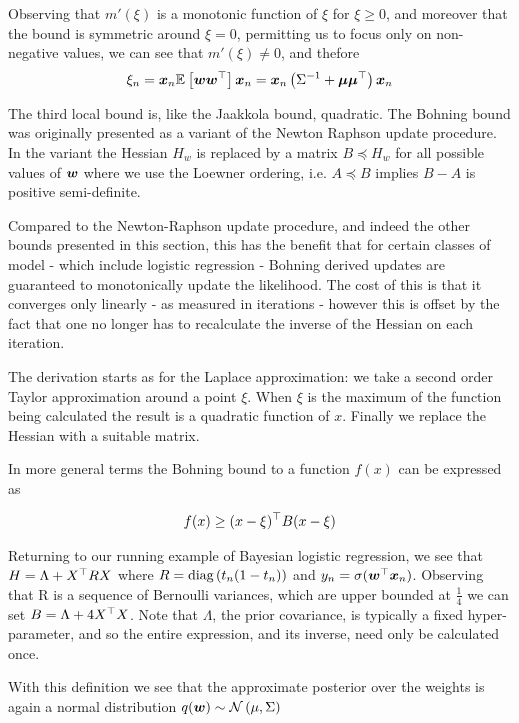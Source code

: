 Observing that $m'(\xi)$ is a monotonic function of $\xi$ for $\xi \geq 0$, and moreover that the bound is symmetric around $\xi = 0$, permitting us to focus only on non-negative values, we can see that $m'(\xi) \neq 0$, and thefore
\begin{align}
\xi_n = \bm x_n \mathbb{E}_{ {  } }\left[ \bm w \bm w^\top  \right] \bm x_n = \bm x_n \left( {\Sigma}^{-1} + \bm \mu \bm \mu^\top \right) \bm x_n
\end{align}

The third local bound is, like the Jaakkola bound, quadratic. The Bohning bound  was originally presented \cite{Bohning1988a} as a variant of the Newton Raphson update procedure. In the variant the Hessian $H_w$ is replaced by a matrix $B \preceq H_w$ for all possible values of $\bm w$ where we use the Loewner ordering, i.e. $A \preceq B$ implies $B - A$ is positive semi-definite.

Compared to the Newton-Raphson update procedure, and indeed the other bounds presented in this section, this has the benefit that for certain classes of model - which include logistic regression - Bohning derived updates are guaranteed to monotonically update the likelihood. The cost of this is that it converges only linearly - as measured in iterations - however this is offset by the fact that one no longer has to recalculate the inverse of the Hessian on each iteration.

The derivation starts as for the Laplace approximation: we take a second order Taylor approximation around a point $\xi$. When $\xi$ is the maximum of the function being calculated the result is a quadratic function of $x$. Finally we replace the Hessian with a suitable matrix.

In more general terms the Bohning bound to a function $f(x)$ can be expressed as

\begin{align}
f(x) \geq (x - \xi)^\top B (x - \xi)
\end{align}

Returning to our running example of Bayesian logistic regression, we see that $H = \Lambda + X^\top R X$ where $R = \text{diag} \left( {t_n (1-t_n)} \right)$ and $y_n = \sigma(\bm w^\top\bm x_n)$. Observing that R is a sequence of Bernoulli variances, which are upper bounded at $\frac{1}{4}$ we can set $B = \Lambda + 4 X^\top X$. Note that $\Lambda$, the prior covariance, is typically a fixed hyper-parameter, and so the entire expression, and its inverse, need only be calculated once.

With this definition we see that the approximate posterior over the weights is again a normal distribution $q(\bm w) \sim \mathcal{N} \left( {\mu}, {\Sigma} \right)$

